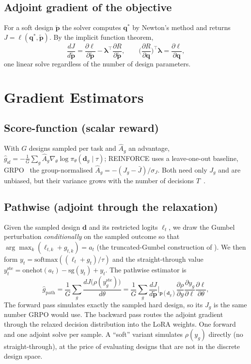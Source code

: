 \documentclass[journal]{IEEEtran}
\newcommand{\Jobj}{J}
\newcommand{\design}{\bm{d}}
\newcommand{\soft}{\tilde{\bm{p}}}
\newcommand{\task}{\tau}
\begin{document}
\subsection{Adjoint gradient of the objective}
For a soft design $\soft$ the solver computes $\bm q^*$ by Newton's method and
returns $\Jobj=\ell(\bm q^*,\soft)$.  By the implicit function theorem,
\begin{equation}
  \frac{d\Jobj}{d\soft}
  =\frac{\partial\ell}{\partial\soft}-\bm\lambda^\top\frac{\partial R}{\partial\soft},
  \qquad
  \Big(\frac{\partial R}{\partial\bm q}\Big)^{\!\top}\bm\lambda=\frac{\partial\ell}{\partial\bm q},
  \label{eq:adjoint}
\end{equation}
one linear solve regardless of the number of design parameters.

\FloatBarrier
\section{Gradient Estimators}
\label{sec:estimators}

\subsection{Score-function (scalar reward)}
With $G$ designs sampled per task and $\hat A_g$ an advantage,
$\hat g_{\mathrm{sf}}=-\frac1G\sum_g \hat A_g\nabla_\theta\log\pi_\theta(\design_g\mid\task)$;
REINFORCE uses a leave-one-out baseline, GRPO~\cite{shao2024grpo} the
group-normalised $\hat A_g=-(\Jobj_g-\bar\Jobj)/\sigma_{\Jobj}$.  Both need only
$\Jobj_g$ and are unbiased, but their variance grows with the number of
decisions $T$~\cite{mohamed2020mcgrad}.

\subsection{Pathwise (adjoint through the relaxation)}
Given the sampled design $\design$ and its restricted logits $\ell_t$, we draw
the Gumbel perturbation \emph{conditionally} on the sampled outcome so that
$\arg\max_k(\ell_{t,k}+g_{t,k})=a_t$ (the truncated-Gumbel construction of \cite{maddison2017concrete}).  We then form
$y_t=\mathrm{softmax}((\ell_t+g_t)/\tau)$ and the straight-through value $y_t^{\mathrm{ste}}=\mathrm{onehot}(a_t)-\mathrm{sg}(y_t)+y_t$.
The pathwise estimator is
\begin{equation}
  \hat g_{\mathrm{path}}=\frac1G\sum_g\frac{d\Jobj\big(\rho(y^{\mathrm{ste}}_g)\big)}{d\theta}
  =\frac1G\sum_g\frac{d\Jobj}{d\soft}\Big|_{\bm p(\design_g)}\frac{\partial\rho}{\partial y}\frac{\partial y_g}{\partial\ell}\frac{\partial\ell}{\partial\theta},
  \label{eq:pathwise}
\end{equation}
The forward pass simulates exactly the sampled hard design, so its $\Jobj_g$ is
the same number GRPO would use.  The backward pass routes the adjoint gradient
through the relaxed decision distribution into the LoRA weights.  One
forward and one adjoint solve per sample.  A ``soft'' variant simulates
$\rho(y_g)$ directly (no straight-through), at the price of evaluating designs
that are not in the discrete design space.
\end{document}

